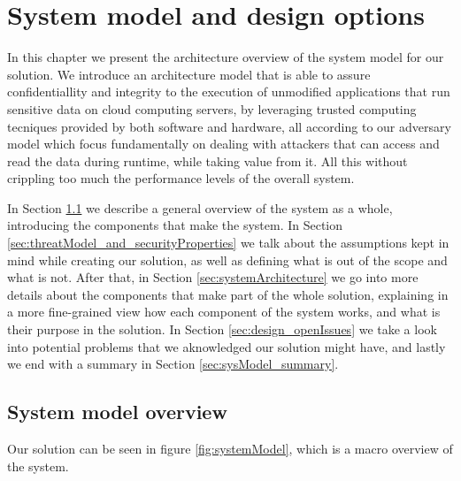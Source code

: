 \chapter{System model and design options}
\label{cha:systemModel_and_designOptions}

In this chapter we present the architecture overview of the system model for our solution. We introduce an architecture model that is able to assure confidentiallity and integrity to the execution of unmodified applications that run sensitive data on cloud computing servers, by leveraging trusted computing tecniques provided by both software and hardware, all according to our adversary model which focus fundamentally on dealing with attackers that can access and read the data during runtime, while taking value from it. All this without crippling too much the performance levels of the overall system.

In Section \ref{sec:systemModel_overview} we describe a general overview of the system as a whole, introducing the components that make the system. In Section \ref{sec:threatModel_and_securityProperties} we talk about the assumptions kept in mind while creating our solution, as well as defining what is out of the scope and what is not.
After that, in Section \ref{sec:systemArchitecture} we go into more details about the components that make part of the whole solution, explaining in a more fine-grained view how each component of the system works, and what is their purpose in the solution. 
In Section \ref{sec:design_openIssues} we take a look into potential problems that we aknowledged our solution might have, and lastly we end with a summary in Section \ref{sec:sysModel_summary}.





\section{System model overview} %
\label{sec:systemModel_overview}

Our solution can be seen in figure \ref{fig:systemModel}, which is a macro overview of the system. 

